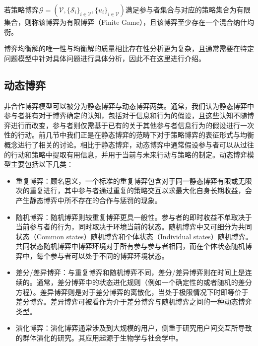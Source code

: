 \begin{thm}[有限博弈中混合纳什均衡的存在性]
若策略博弈$\mathcal{G}=(\mathcal{V},\{\mathcal{S}_i\}_{i\in\mathcal{V}},\{u_i\}_{i\in\mathcal{V}})$满足参与者集合与对应的策略集合为有限集合，则称该博弈为有限博弈（Finite Game），且该博弈至少存在一个混合纳什均衡。
\end{thm}

博弈均衡解的唯一性与均衡解的质量相比存在性分析更为复杂，且通常需要在特定问题模型中针对具体问题进行具体分析，因此不在这里进行介绍。


\subsection{动态博弈}
非合作博弈模型可以被分为静态博弈与动态博弈两类\cite{osborne,Fudenberg,han2012game}。通常，我们认为静态博弈中参与者拥有对于博弈确定的认知，包括对于信息和行为的假设，且这些认知不随博弈进行而改变，参与者则仅需基于已有的关于其他参与者信息行为的假设进行一次性的行动。前几节中我们正是在静态博弈的范畴下对于策略博弈的表征形式与均衡概念进行了相关的讨论。相比于静态博弈，动态博弈中通常假设参与者可以从过往的行动和策略中提取有用信息，并用于当前与未来行动与策略的制定。动态博弈模型主要包括以下几类：

\begin{itemize}
\item {\heiti 重复博弈：}顾名思义，一个标准的重复博弈包含对于同一静态博弈有限或无限次的重复进行，其中参与者通过重复的策略交互以求最大化自身长期收益，会产生静态博弈中所不存在的合作与惩罚的现象。
\item {\heiti 随机博弈：}随机博弈则较重复博弈更具一般性。参与者的即时收益不单取决于当前参与者的行为，同时取决于环境当前的状态。随机博弈中又可细分为共同状态（Common states）随机博弈和个体状态（Individual states）随机博弈。共同状态随机博弈中博弈环境对于所有参与参与者相同，而在个体状态随机博弈中，每个参与者可以处于不同的博弈环境状态。
\item {\heiti 差分/差异博弈：}与重复博弈和随机博弈不同，差分/差异博弈则在时间上是连续的。通常，差分博弈中的状态进化规则（例如一个确定性的或者随机的差分方程）。差异博弈则是对于差分博弈的离散化，当处于极限情况下时即等价于差分博弈。差异博弈可被看作为介于差分博弈与随机博弈之间的一种动态博弈类型。
\item {\heiti 演化博弈：}演化博弈通常涉及到大规模的用户，侧重于研究用户间交互所导致的群体演化的研究。其应用起源于生物学与社会学中。
\end{itemize}


